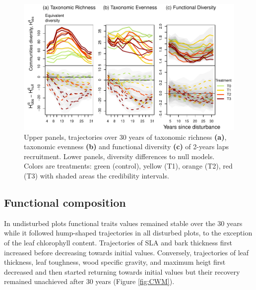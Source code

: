 \documentclass[fleqn,10pt]{ArtEcoFoG} %
\begin{document}
\begin{figure}

{\centering \includegraphics{RecruitmentTrajectories_files/figure-latex/DivTraj-1} 

}

\caption{Upper panels, trajectories over 30 years of taxonomic richness \textbf{(a)}, taxonomic evenness \textbf{(b)} and functional diversity \textbf{(c)} of 2-years laps recruitment. Lower panels, diversity differences to null models. Colors are treatments: green (control), yellow (T1), orange (T2), red (T3) with shaded areas the credibility intervals.}\label{fig:DivTraj}
\end{figure}

\subsection{Functional composition}\label{functional-composition}

In undisturbed plots functional traits values remained stable over the
30 years while it followed hump-shaped trajectories in all disturbed
plots, to the exception of the leaf chlorophyll content. Trajectories of
SLA and bark thickness first increased before decreasing towards initial
values. Conversely, trajectories of leaf thickness, leaf toughness, wood
specific gravity, and maximum heigt first decreased and then started
returning towards initial values but their recovery remained unachieved
after 30 years (Figure \ref{fig:CWM}).
\end{document}
